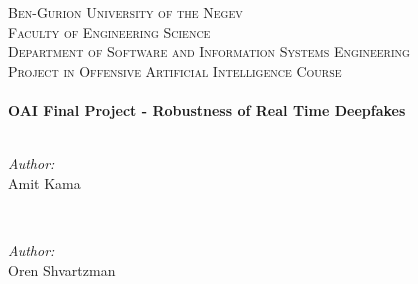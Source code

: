 \documentclass[english,12pt]{article}
\begin{document}
\begin{titlepage}
\textsc{\LARGE Ben-Gurion University of the Negev}\\[1.5cm] 

\textsc{\Large Faculty of Engineering Science}\\[0.5cm] 

\textsc{\large Department of Software and Information Systems
Engineering}\\[0.5cm] 

\textsc{\large Project in Offensive Artificial Intelligence Course}\\[0.5cm] 



\HRule \\[0.4cm]
{ \huge \bfseries OAI Final Project - Robustness of Real Time Deepfakes } \\[0.4cm] 
\HRule \\[1.5cm]
 

\begin{minipage}{0.4\textwidth}
\begin{flushleft} \large \emph{Author:}\\
Amit Kama %
\end{flushleft}
\end{minipage}
~
\begin{minipage}{0.4\textwidth}
\begin{flushright} \large \emph{Author:} \\
Oren Shvartzman %
\end{flushright}
\end{minipage}\\[3cm]

    

\end{titlepage}
\end{document}
